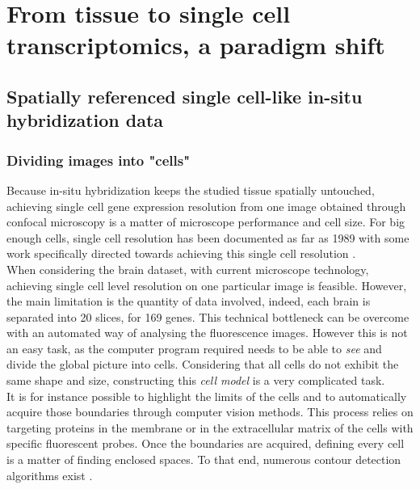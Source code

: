 \chapter{From tissue to single cell transcriptomics, a paradigm shift}\label{ch:singlecell}
\section{Spatially referenced single cell-like in-situ hybridization data}\label{sec:single_cell_insitu}
  \subsection{Dividing images into "cells"}
  Because in-situ hybridization keeps the studied tissue spatially untouched, achieving single cell gene expression resolution from one image obtained through confocal microscopy is a matter of microscope performance and cell size. For big enough cells, single cell resolution has been documented as far as 1989 \cite{tautz89} with some work specifically directed towards achieving this single cell resolution \cite{poulsen93}.\\
  
  When considering the \platy{} brain dataset, with current microscope technology, achieving single cell level resolution on one particular image is feasible. However, the main limitation is the quantity of data involved, indeed, each brain is separated into 20 slices, for 169 genes. This technical bottleneck can be overcome with an automated way of analysing the fluorescence images. However this is not an easy task, as the computer program required needs to be able to \emph{see} and divide the global picture into cells. Considering that all cells do not exhibit the same shape and size, constructing this \emph{cell model} is a very complicated task.\\
  
  It is for instance possible to highlight the limits of the cells and to automatically acquire those boundaries through computer vision methods. This process relies on targeting proteins in the membrane or in the extracellular matrix of the cells with specific fluorescent probes. Once the boundaries are acquired, defining every cell is a matter of finding enclosed spaces. To that end, numerous contour detection algorithms exist \cite{li95,fan01,arbelaez11}.\\
  
